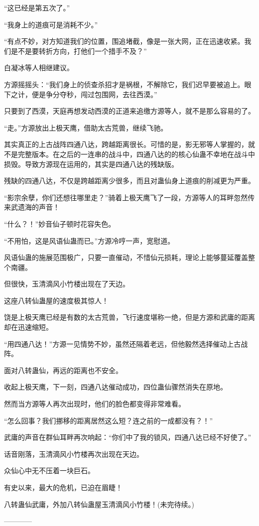 \begin{this_body}
“这已经是第五次了。”

“我身上的道痕可是消耗不少。”

“有点不妙，对方知道我们的位置，围追堵截，像是一张大网，正在迅速收紧。我们是不是要转折方向，打他们一个措手不及？”

白凝冰等人相继建议。

方源摇摇头：“我们身上的侦查杀招才是祸根，不解除它，我们迟早要被追上。眼下之计，便是争分夺秒，闯过包围网，去往西漠。”

只要到了西漠，天庭再想发动西漠的正道来追缴方源等人，就不是那么容易的了。

“走。”方源放出上极天鹰，借助太古荒兽，继续飞驰。

其实真正的上古战阵四通八达，跨越距离很长。可惜的是，影无邪等人掌握的，就不是完整版本。在之后的一连串的战斗中，四通八达的的核心仙蛊不幸地在战斗中损毁。导致方源现在运用的，其实是四通八达的残缺版。

残缺的四通八达，不仅是跨越距离少很多，而且对蛊仙身上道痕的削减更为严重。

“影宗余孽，你们还想往哪里走？”骑着上极天鹰飞了一段，方源等人的耳畔忽然传来武遗海的声音！

“什么？！”妙音仙子顿时花容失色。

“不用怕，这是风语仙蛊而已。”方源冷哼一声，宽慰道。

风语仙蛊的施展范围极广，只要一直催动，不惜仙元损耗，理论上能够蔓延覆盖整个南疆。

但很快，玉清滴风小竹楼出现在了天边。

这座八转仙蛊屋的速度极其惊人！

饶是上极天鹰已经是有数的太古荒兽，飞行速度堪称一绝，但是方源和武庸的距离却在迅速缩短。

“用四通八达！”方源一见情势不妙，虽然还隔着老远，但他毅然选择催动上古战阵。

面对八转蛊仙，再远的距离也不安全。

收起上极天鹰，下一刻，四通八达催动成功，四位蛊仙骤然消失在原地。

然而当方源等人再次出现时，他们的脸色都变得非常难看。

“怎么回事？我们挪移的距离居然这么短？连之前的一成都没有？！”

武庸的声音在群仙耳畔再次响起：“你们中了我的锁风，四通八达已经不好使了。”

话音刚落，玉清滴风小竹楼再次出现在天边。

众仙心中无不压着一块巨石。

有史以来，最大的危机，已迫在眉睫！

八转蛊仙武庸，外加八转仙蛊屋玉清滴风小竹楼！(未完待续。)

------------

\end{this_body}

